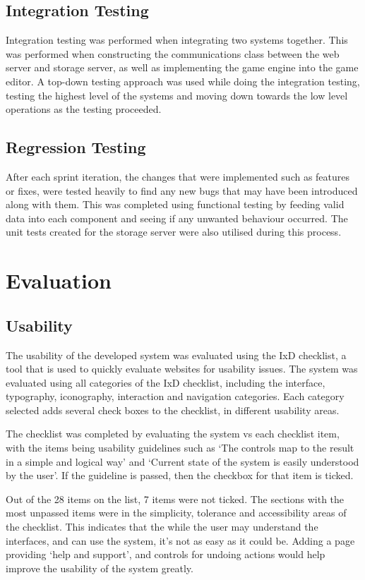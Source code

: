 	\subsection{Integration Testing}
	Integration testing was performed when integrating two systems together. This was performed when constructing the communications class between the web server and storage server, as well as implementing the game engine into the game editor. A top-down testing approach was used while doing the integration testing, testing the highest level of the systems and moving down towards the low level operations as the testing proceeded.

	\subsection{Regression Testing}
	After each sprint iteration, the changes that were implemented such as features or fixes, were tested heavily to find any new bugs that may have been introduced along with them. This was completed using functional testing by feeding valid data into each component and seeing if any unwanted behaviour occurred. The unit tests created for the storage server were also utilised during this process.

\section{Evaluation}
	\subsection{Usability}
	The usability of the developed system was evaluated using the IxD checklist, a tool that is used to quickly evaluate websites for usability issues. The system was evaluated using all categories of the IxD checklist, including the interface, typography, iconography, interaction and navigation categories. Each category selected adds several check boxes to the checklist, in different usability areas.

	The checklist was completed by evaluating the system vs each checklist item, with the items being usability guidelines such as `The controls map to the result in a simple and logical way' and `Current state of the system is easily understood by the user'. If the guideline is passed, then the checkbox for that item is ticked.


	Out of the 28 items on the list, 7 items were not ticked. The sections with the most unpassed items were in the simplicity, tolerance and accessibility areas of the checklist. This indicates that the while the user may understand the interfaces, and can use the system, it's not as easy as it could be. Adding a page providing `help and support', and controls for undoing actions would help improve the usability of the system greatly.

